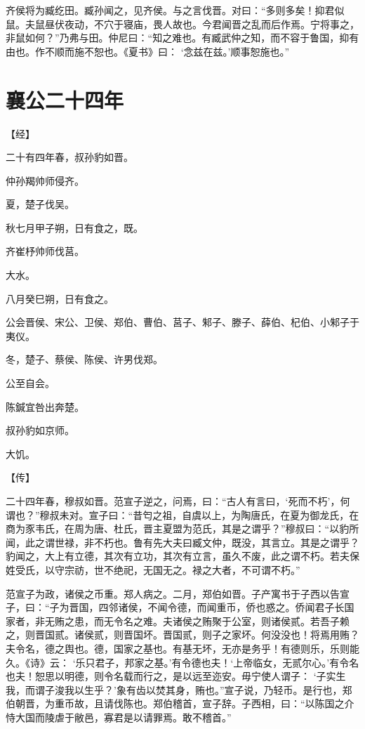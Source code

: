 \documentclass[a4paper,12pt,UTF8,twoside]{ctexbook}
\begin{document}
齐侯将为臧纥田。臧孙闻之，见齐侯。与之言伐晋。对曰：“多则多矣！抑君似鼠。夫鼠昼伏夜动，不穴于寝庙，畏人故也。今君闻晋之乱而后作焉。宁将事之，非鼠如何？”乃弗与田。仲尼曰：“知之难也。有臧武仲之知，而不容于鲁国，抑有由也。作不顺而施不恕也。《夏书》曰： ‘念兹在兹。’顺事恕施也。”

\section{襄公二十四年}


【经】

二十有四年春，叔孙豹如晋。

仲孙羯帅师侵齐。

夏，楚子伐吴。

秋七月甲子朔，日有食之，既。

齐崔杼帅师伐莒。

大水。

八月癸巳朔，日有食之。

公会晋侯、宋公、卫侯、郑伯、曹伯、莒子、邾子、滕子、薛伯、杞伯、小邾子于夷仪。

冬，楚子、蔡侯、陈侯、许男伐郑。

公至自会。

陈鍼宜咎出奔楚。

叔孙豹如京师。

大饥。

【传】

二十四年春，穆叔如晋。范宣子逆之，问焉，曰：“古人有言曰，‘死而不朽’，何谓也？”穆叔未对。宣子曰：“昔匄之祖，自虞以上，为陶唐氏，在夏为御龙氏，在商为豕韦氏，在周为唐、杜氏，晋主夏盟为范氏，其是之谓乎？”穆叔曰：“以豹所闻，此之谓世禄，非不朽也。鲁有先大夫曰臧文仲，既没，其言立。其是之谓乎？豹闻之，大上有立德，其次有立功，其次有立言，虽久不废，此之谓不朽。若夫保姓受氏，以守宗祊，世不绝祀，无国无之。禄之大者，不可谓不朽。”

范宣子为政，诸侯之币重。郑人病之。二月，郑伯如晋。子产寓书于子西以告宣子，曰：“子为晋国，四邻诸侯，不闻令德，而闻重币，侨也惑之。侨闻君子长国家者，非无贿之患，而无令名之难。夫诸侯之贿聚于公室，则诸侯贰。若吾子赖之，则晋国贰。诸侯贰，则晋国坏。晋国贰，则子之家坏。何没没也！将焉用贿？夫令名，德之舆也。德，国家之基也。有基无坏，无亦是务乎！有德则乐，乐则能久。《诗》云： ‘乐只君子，邦家之基。’有令德也夫！‘上帝临女，无贰尔心。’有令名也夫！恕思以明德，则令名载而行之，是以远至迩安。毋宁使人谓子： ‘子实生我，而谓子浚我以生乎？’象有齿以焚其身，贿也。”宣子说，乃轻币。是行也，郑伯朝晋，为重币故，且请伐陈也。郑伯稽首，宣子辞。子西相，曰：“以陈国之介恃大国而陵虐于敝邑，寡君是以请罪焉。敢不稽首。”
\end{document}

